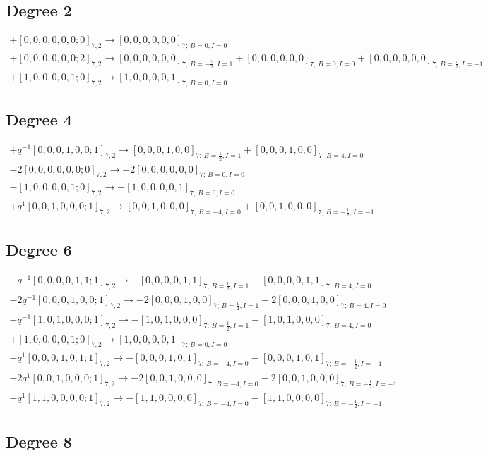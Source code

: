 \documentclass{article}
\begin{document}
\subsection*{Degree 2}
\[\begin{gathered} +[0,0,0,0,0,0;0]_{7,2}\longrightarrow [0,0,0,0,0,0]_{7;\,B=0,I=0}\\+[0,0,0,0,0,0;2]_{7,2}\longrightarrow [0,0,0,0,0,0]_{7;\,B=-\frac{7}{2},I=1} +[0,0,0,0,0,0]_{7;\,B=0,I=0} +[0,0,0,0,0,0]_{7;\,B=\frac{7}{2},I=-1}\\+[1,0,0,0,0,1;0]_{7,2}\longrightarrow [1,0,0,0,0,1]_{7;\,B=0,I=0}\end{gathered}\]\subsection*{Degree 4}
\[\begin{gathered} +q^{-1}[0,0,0,1,0,0;1]_{7,2}\longrightarrow [0,0,0,1,0,0]_{7;\,B=\frac{1}{2},I=1} +[0,0,0,1,0,0]_{7;\,B=4,I=0}\\-2[0,0,0,0,0,0;0]_{7,2}\longrightarrow -2[0,0,0,0,0,0]_{7;\,B=0,I=0}\\-[1,0,0,0,0,1;0]_{7,2}\longrightarrow -[1,0,0,0,0,1]_{7;\,B=0,I=0}\\+q^{1}[0,0,1,0,0,0;1]_{7,2}\longrightarrow [0,0,1,0,0,0]_{7;\,B=-4,I=0} +[0,0,1,0,0,0]_{7;\,B=-\frac{1}{2},I=-1}\end{gathered}\]\subsection*{Degree 6}
\[\begin{gathered} -q^{-1}[0,0,0,0,1,1;1]_{7,2}\longrightarrow -[0,0,0,0,1,1]_{7;\,B=\frac{1}{2},I=1} -[0,0,0,0,1,1]_{7;\,B=4,I=0}\\-2q^{-1}[0,0,0,1,0,0;1]_{7,2}\longrightarrow -2[0,0,0,1,0,0]_{7;\,B=\frac{1}{2},I=1} -2[0,0,0,1,0,0]_{7;\,B=4,I=0}\\-q^{-1}[1,0,1,0,0,0;1]_{7,2}\longrightarrow -[1,0,1,0,0,0]_{7;\,B=\frac{1}{2},I=1} -[1,0,1,0,0,0]_{7;\,B=4,I=0}\\+[1,0,0,0,0,1;0]_{7,2}\longrightarrow [1,0,0,0,0,1]_{7;\,B=0,I=0}\\-q^{1}[0,0,0,1,0,1;1]_{7,2}\longrightarrow -[0,0,0,1,0,1]_{7;\,B=-4,I=0} -[0,0,0,1,0,1]_{7;\,B=-\frac{1}{2},I=-1}\\-2q^{1}[0,0,1,0,0,0;1]_{7,2}\longrightarrow -2[0,0,1,0,0,0]_{7;\,B=-4,I=0} -2[0,0,1,0,0,0]_{7;\,B=-\frac{1}{2},I=-1}\\-q^{1}[1,1,0,0,0,0;1]_{7,2}\longrightarrow -[1,1,0,0,0,0]_{7;\,B=-4,I=0} -[1,1,0,0,0,0]_{7;\,B=-\frac{1}{2},I=-1}\end{gathered}\]\subsection*{Degree 8}
\end{document}
